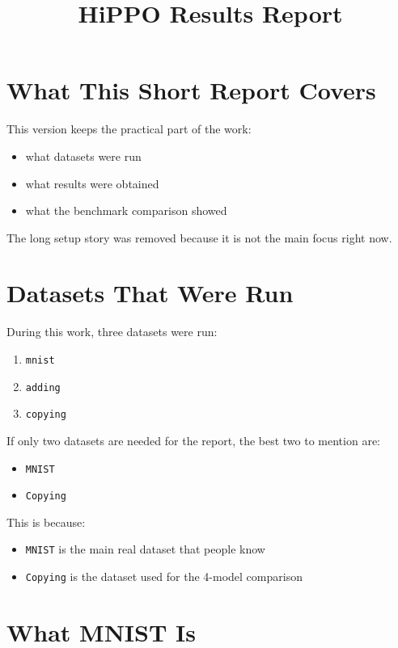 \documentclass[12pt]{article}
\title{HiPPO Results Report}
\author{}
\date{}
\begin{document}
\maketitle

\section*{What This Short Report Covers}

This version keeps the practical part of the work:

\begin{itemize}
    \item what datasets were run
    \item what results were obtained
    \item what the benchmark comparison showed
\end{itemize}

The long setup story was removed because it is not the main focus right now.

\section*{Datasets That Were Run}

During this work, three datasets were run:

\begin{enumerate}
    \item \texttt{mnist}
    \item \texttt{adding}
    \item \texttt{copying}
\end{enumerate}

If only two datasets are needed for the report, the best two to mention are:

\begin{itemize}
    \item \texttt{MNIST}
    \item \texttt{Copying}
\end{itemize}

This is because:

\begin{itemize}
    \item \texttt{MNIST} is the main real dataset that people know
    \item \texttt{Copying} is the dataset used for the 4-model comparison
\end{itemize}

\section*{What MNIST Is}
\end{document}

